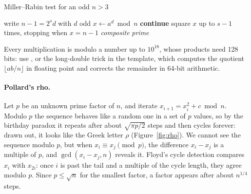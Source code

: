 \begin{pseudo}{Miller--Rabin test for an odd $n > 3$}
\begin{algorithmic}[1]
\State write $n - 1 = 2^s d$ with $d$ odd
  \State $x \gets a^d \bmod n$
   \State \textbf{continue}  \EndIf
  \State square $x$ up to $s - 1$ times, stopping when $x = n - 1$
   \State \Return \emph{composite}  \EndIf
\EndFor
\State \Return \emph{prime}
\end{algorithmic}
\end{pseudo}

Every multiplication is modulo a number up to $10^{18}$, whose products need 128 bits: use , or the long-double trick in
the template, which computes the quotient $\lfloor ab/n \rfloor$ in floating point and corrects the remainder in 64-bit arithmetic.

\paragraph{Pollard's rho.} Let $p$ be an unknown prime factor of $n$, and iterate $x_{i+1} = x_i^2 + c \bmod n$. Modulo $p$ the
sequence behaves like a random one in a set of $p$ values, so by the birthday paradox it repeats after about $\sqrt{\pi p / 2}$ steps
and then cycles forever: drawn out, it looks like the Greek letter $\rho$ (Figure~\ref{fig:rho}). We cannot see the sequence modulo
$p$, but when $x_i \equiv x_j \pmod p$, the difference $x_i - x_j$ is a multiple of $p$, and $\gcd(x_i - x_j, n)$ reveals it. Floyd's
cycle detection compares $x_i$ with $x_{2i}$: once $i$ is past the tail and a multiple of the cycle length, they agree modulo $p$.
Since $p \le \sqrt n$ for the smallest factor, a factor appears after about $n^{1/4}$ steps.

